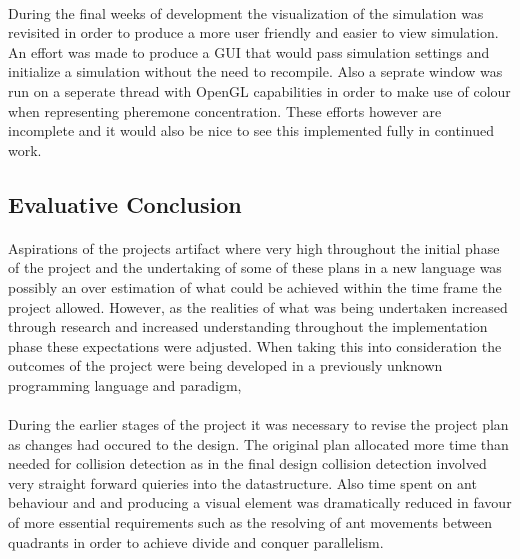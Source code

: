 \documentclass[main.tex]{subfiles}
\begin{document}
\paragraph{}During the final weeks of development the visualization of the simulation was revisited in order to produce a more user friendly and easier to view simulation. An effort was made to produce a GUI that would pass simulation settings and initialize a simulation without the need to recompile. Also a seprate window was run on a seperate thread with OpenGL capabilities in order to make use of colour when representing pheremone concentration. These efforts however are incomplete and it would also be nice to see this implemented fully in continued work.

\subsection{Evaluative Conclusion}
\paragraph{}Aspirations of the projects artifact where very high throughout the initial phase of the project and the undertaking of some of these plans in a new language was possibly an over estimation of what could be achieved within the time frame the project allowed. However, as the realities of what was being undertaken  increased through research and increased understanding throughout the implementation phase these expectations were adjusted. When taking this into consideration the outcomes of the project were being developed in a previously unknown programming language and paradigm,

\paragraph{}During the earlier stages of the project it was necessary to revise the project plan as changes had occured to the design. The original plan allocated more time than needed for collision detection as in the final design collision detection involved very straight forward quieries into the datastructure. Also time spent on ant behaviour and and producing a visual element was dramatically reduced in favour of more essential requirements such as the resolving of ant movements between quadrants in order to achieve divide and conquer parallelism. 
\end{document}
